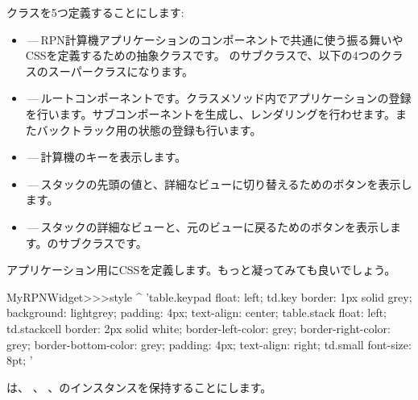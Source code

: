 \documentclass[a4paper,10pt,twoside]{book}
\begin{document}
クラスを5つ定義することにします:
\begin{itemize}
  \item {}\,---\,RPN計算機アプリケーションのコンポーネントで共通に使う振る舞いやCSSを定義するための抽象クラスです。  のサブクラスで、以下の4つのクラスのスーパークラスになります。
  
  \item {}\,---\,ルートコンポーネントです。クラスメソッド内でアプリケーションの登録を行います。サブコンポーネントを生成し、レンダリングを行わせます。またバックトラック用の状態の登録も行います。
  
  
  \item {}\,---\,計算機のキーを表示します。
  \item {}\,---\,スタックの先頭の値と、詳細なビューに切り替えるためのボタンを表示します。
  \item {}\,---\,スタックの詳細なビューと、元のビューに戻るためのボタンを表示します。のサブクラスです。

\end{itemize}


アプリケーション用にCSSを定義します。もっと凝ってみても良いでしょう。
\begin{code}{}
MyRPNWidget>>>style
	^ 'table.keypad { float: left; }
td.key {
	border: 1px solid grey;
	background: lightgrey;
	padding: 4px;
	text-align: center;
}
table.stack { float: left; }
td.stackcell {
	border: 2px solid white;
	border-left-color: grey;
	border-right-color: grey;
	border-bottom-color: grey;
	padding: 4px;
	text-align: right;
}
td.small { font-size: 8pt; }'
\end{code}


 は、 、 、のインスタンスを保持することにします。

\end{document}
